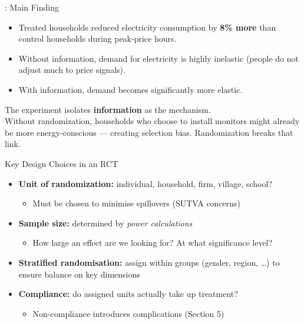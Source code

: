 \documentclass[aspectratio=169, 11pt]{beamer}
\begin{document}
\begin{frame}[t]{\citeauthor{Jessoe2014_energy}: Main Finding}
\begin{itemize}
  \setlength\itemsep{0.5em}
  \item Treated households reduced electricity consumption by \textbf{8\% more}
        than control households during peak-price hours.
  \item Without information, demand for electricity is highly inelastic
        (people do not adjust much to price signals).
  \item With information, demand becomes significantly more elastic.
\end{itemize}
\vspace{0.3em}
\begin{intuitionbox}
The experiment isolates \textbf{information} as the mechanism.\\[0.3em]
Without randomization, households who choose to install monitors
might already be more energy-conscious — creating selection bias.
Randomization breaks that link.
\end{intuitionbox}
\end{frame}

\begin{frame}[t]{Key Design Choices in an RCT}
\begin{itemize}
  \setlength\itemsep{0.5em}
  \item \textbf{Unit of randomization:} individual, household, firm, village, school?
    \begin{itemize}
      \item Must be chosen to minimise spillovers (SUTVA concerns)
    \end{itemize}
  \item \textbf{Sample size:} determined by \emph{power calculations}
    \begin{itemize}
      \item How large an effect are we looking for? At what significance level?
    \end{itemize}
  \item \textbf{Stratified randomisation:} assign within groups (gender, region, \ldots)
    to ensure balance on key dimensions
  \item \textbf{Compliance:} do assigned units actually take up treatment?
    \begin{itemize}
      \item Non-compliance introduces complications (Section 5)
    \end{itemize}
\end{itemize}
\vspace{0.3em}
\end{frame}
\end{document}
